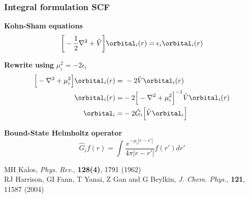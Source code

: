 
\begin{frame}
    \frametitle{Integral formulation SCF}
    \centering
    \textbf{Kohn-Sham equations}
    \begin{equation}
	\nonumber
	\bigg[-\frac{1}{2}\nabla^2 + \hat{V}\bigg]\orbital_i(r) = \epsilon_i \orbital_i(r)
    \end{equation}

    \vspace{5mm}

    \textbf{Rewrite using} $\mu_i^2 = -2\epsilon_i$
    \begin{align}
	\nonumber
	\Big[-\nabla^2 + \mu_i^2\Big]\orbital_i(r) =&\ -2\hat{V}\orbital_i(r)\\
	\nonumber
	\orbital_i(r) =&-2\Big[-\nabla^2 + \mu_i^2\Big]^{-1}\hat{V}\orbital_i(r)\\
	\nonumber
	\orbital_i =&-2\hat{G}_i\Big[\hat{V}\orbital_i\Big]
    \end{align}

    \vspace{5mm}

    \textbf{Bound-State Helmholtz operator}
    \begin{equation}
	\nonumber
	\hat{G}_if(r) = \int \frac{e^{-\mu_i |r-r'|}}{4\pi|r-r'|}f(r')dr'
    \end{equation}

    \vspace{5mm}

    \centering
    \tiny
    MH Kalos,
    {\it Phys. Rev.}, 
    \textbf{128(4)},
    1791 (1962)\\
    RJ Harrison, GI Fann, T Yanai, Z Gan and G Beylkin,
    {\it J. Chem. Phys.}, 
    \textbf{121},
    11587 (2004)
\end{frame}

